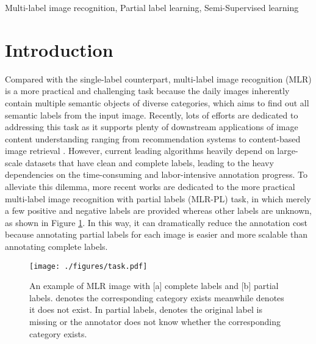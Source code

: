 \documentclass[lettersize,journal]{IEEEtran}
\begin{document}
\begin{IEEEkeywords}
Multi-label image recognition, Partial label learning, Semi-Supervised learning
\end{IEEEkeywords}

\section{Introduction} \label{sec:intro}
Compared with the single-label counterpart, multi-label image recognition (MLR) is a more practical and challenging task because the daily images inherently contain multiple semantic objects of diverse categories, which aims to find out all semantic labels from the input image. Recently, lots of efforts \cite{sun2014multi, gao2021learning, Li2021T-CYB, Zhang2020T-CYB, Liu2017T-CYB} are dedicated to addressing this task as it supports plenty of downstream applications of image content understanding ranging from recommendation systems \cite{Carrillo2013Multi, Zheng2014Context, Fu2022T-CYB} to content-based image retrieval \cite{Li2010Technique, Zhang2021Instance, lai2016instance, shen2021deep_tmm}. However, current leading algorithms \cite{Wu2020AdaHGNN, Chen2022KGGR, Chen2021P-GCN} heavily depend on large-scale datasets that have clean and complete labels, leading to the heavy dependencies on the time-consuming and labor-intensive annotation progress. To alleviate this dilemma, more recent works \cite{Durand2019CVPR, Chen2022SST, Pu2022SARB, Pu2022MLR-PPL} are dedicated to the more practical multi-label image recognition with partial labels (MLR-PL) task, in which merely a few positive and negative labels are provided whereas other labels are unknown, as shown in Figure \ref{fig:task}. In this way, it can dramatically reduce the annotation cost because annotating partial labels for each image is easier and more scalable than annotating complete labels.

\begin{figure}[!t] 
  \centering
  \texttt{[image: ./figures/task.pdf]}
  \caption{An example of MLR image with  [a] complete labels and [b] partial labels.  denotes the corresponding category exists meanwhile  denotes it does not exist. In partial labels, {\color{red} } denotes the original label is missing or the annotator does not know whether the corresponding category exists.}     
  \label{fig:task}     
\end{figure}
\end{document}
